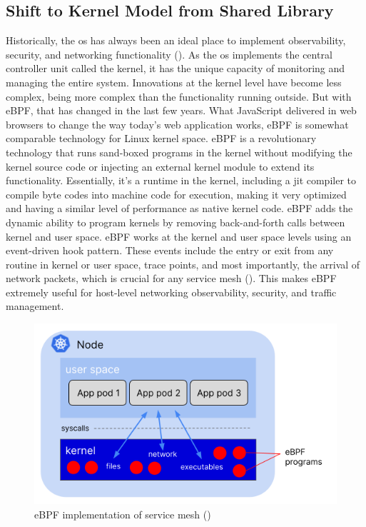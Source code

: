 \subsection{Shift to Kernel Model from Shared Library}
\label{lr:ebpf}
Historically, the \acrfull{os} has always been an ideal place to implement observability, security, and networking functionality (\cite{ebpfIODocs}). As the \acrshort{os} implements the central controller unit called the kernel, it has the unique capacity of monitoring and managing the entire system. Innovations at the kernel level have become less complex, being more complex than the functionality running outside. But with eBPF, that has changed in the last few years. What JavaScript delivered in web browsers to change the way today's web application works, eBPF is somewhat comparable technology for Linux kernel space. eBPF is a revolutionary technology that runs sand-boxed programs in the kernel without modifying the kernel source code or injecting an external kernel module to extend its functionality. Essentially, it's a runtime in the kernel, including a \acrshort{jit} compiler to compile byte codes into machine code for execution, making it very optimized and having a similar level of performance as native kernel code. eBPF adds the dynamic ability to program kernels by removing back-and-forth calls between kernel and user space. eBPF works at the kernel and user space levels using an event-driven hook pattern. These events include the entry or exit from any routine in kernel or user space, trace points, and most importantly, the arrival of network packets, which is crucial for any service mesh (\cite{thenewstackRice2021}). This makes eBPF extremely useful for host-level networking observability, security, and traffic management.

\begin{figure}[ht!]
  \centering
  \includegraphics[width=0.65\linewidth]{resources/ebpf-service-mesh.png}
  \caption{eBPF implementation of service mesh (\cite{thenewstackRice2021})}
  \label{lr:ebpfDesign}
 \end{figure}

